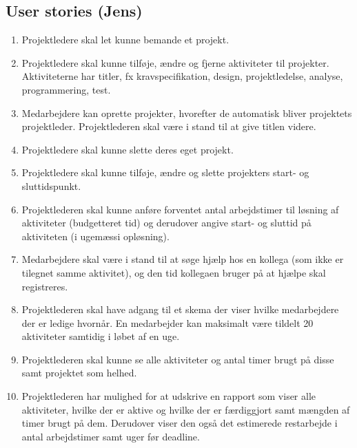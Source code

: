 \subsection{User stories (Jens)}
\begin{enumerate}

\item Projektledere skal let kunne bemande et projekt.

\item Projektledere skal kunne tilføje, ændre og fjerne aktiviteter til projekter. Aktiviteterne har titler, fx kravspecifikation, design, projektledelse, analyse, programmering, test.

\item Medarbejdere kan oprette projekter, hvorefter de automatisk bliver projektets projektleder. Projektlederen skal være i stand til at give titlen videre. 

\item Projektledere skal kunne slette deres eget projekt.

\item Projektledere skal kunne tilføje, ændre og slette projekters start- og sluttidspunkt.

\item Projektlederen skal kunne anføre forventet antal arbejdstimer til løsning af aktiviteter (budgetteret tid) og derudover angive start- og sluttid på aktiviteten (i ugemæssi opløsning). 

\item Medarbejdere skal være i stand til at søge hjælp hos en kollega (som ikke er tilegnet samme aktivitet), og den tid kollegaen bruger på at hjælpe skal registreres. 

\item Projektlederen skal have adgang til et skema der viser hvilke medarbejdere der er ledige hvornår. En medarbejder kan maksimalt være tildelt 20 aktiviteter samtidig i løbet af en uge. 

\item Projektlederen skal kunne se alle aktiviteter og antal timer brugt på disse samt projektet som helhed. 

\item Projektlederen har mulighed for at udskrive en rapport som viser alle aktiviteter, hvilke der er aktive og hvilke der er færdiggjort samt mængden af timer brugt på dem. Derudover viser den også det estimerede restarbejde i antal arbejdstimer samt uger før deadline. 


\end{enumerate}
